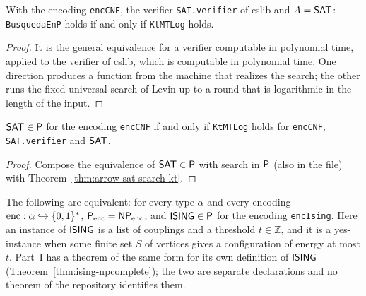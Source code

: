 \begin{theorem}
  \label{thm:arrow-sat-search-kt}
  \leanok
  With the encoding \texttt{encCNF}, the verifier \texttt{SAT.verifier} of cslib and $A = \mathsf{SAT}$:
  \texttt{BusquedaEnP} holds if and only if \texttt{KtMTLog} holds.
  \own{}
\end{theorem}

\begin{proof}
  \leanok
  It is the general equivalence for a verifier computable in polynomial time, applied to the
  verifier of cslib, which is computable in polynomial time. One direction produces a function from
  the machine that realizes the search; the other runs the fixed universal search of Levin up to a
  round that is logarithmic in the length of the input.
\end{proof}

\begin{theorem}
  \label{thm:arrow-sat-p-kt}
  \leanok
  $\mathsf{SAT} \in \mathsf{P}$ for the encoding \texttt{encCNF} if and only if \texttt{KtMTLog} holds for
  \texttt{encCNF}, \texttt{SAT.verifier} and $\mathsf{SAT}$.
  \own{}
\end{theorem}

\begin{proof}
  \leanok
  Compose the equivalence of $\mathsf{SAT} \in \mathsf{P}$ with search in $\cP$ (also in the file) with
  Theorem~\ref{thm:arrow-sat-search-kt}.
\end{proof}

\begin{theorem}[$\cP = \cNP$ if and only if the ground-state problem of the Ising model is in $\cP$, on the machines of cslib-frontier]
  \label{thm:arrow-ising-in-p}
  \leanok
  The following are equivalent: for every type $\alpha$ and every encoding $\mathrm{enc} : \alpha
  \hookrightarrow \{0,1\}^*$, $\mathsf{P}_{\mathrm{enc}} = \mathsf{NP}_{\mathrm{enc}}$; and $\mathsf{ISING} \in \mathsf{P}$ for the encoding
  \texttt{encIsing}. Here an instance of $\mathsf{ISING}$ is a list of couplings and a threshold $t \in
  \mathbb{Z}$, and it is a yes-instance when some finite set $S$ of vertices gives a configuration of
  energy at most $t$. Part~I has a theorem of the same form for its own definition of $\mathsf{ISING}$
  (Theorem~\ref{thm:ising-npcomplete}); the two are separate declarations and no theorem of the
  repository identifies them.
  \own{}
\end{theorem}

